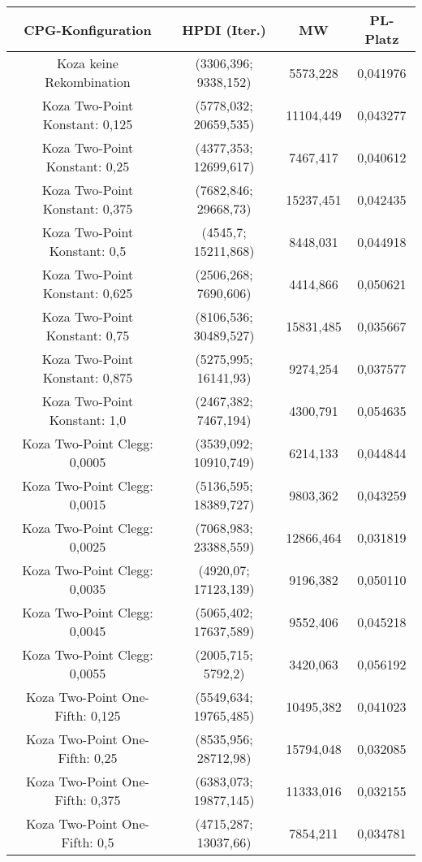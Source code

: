 \begin{table}[H]
	\centering
	\begin{tabular}{c | c | c | c}
		\textbf{CPG-Konfiguration} & \textbf{HPDI (Iter.)} & \textbf{MW} & \textbf{PL-Platz}\\
		\hline
		Koza keine Rekombination & (3306,396; 9338,152) & 5573,228 & 0,041976\\
		\hline
		Koza Two-Point Konstant: 0,125 & (5778,032; 20659,535) & 11104,449 & 0,043277\\
		\hline
		Koza Two-Point Konstant: 0,25 & (4377,353; 12699,617) & 7467,417 & 0,040612\\
		\hline
		Koza Two-Point Konstant: 0,375 & (7682,846; 29668,73) & 15237,451 & 0,042435\\
		\hline
		Koza Two-Point Konstant: 0,5 & (4545,7; 15211,868) & 8448,031 & 0,044918\\
		\hline
		Koza Two-Point Konstant: 0,625 & (2506,268; 7690,606) & 4414,866 & 0,050621\\
		\hline
		Koza Two-Point Konstant: 0,75 & (8106,536; 30489,527) & 15831,485 & 0,035667\\
		\hline
		Koza Two-Point Konstant: 0,875 & (5275,995; 16141,93) & 9274,254 & 0,037577\\
		\hline
		Koza Two-Point Konstant: 1,0 & (2467,382; 7467,194) & 4300,791 & 0,054635\\
		\hline
		Koza Two-Point Clegg: 0,0005 & (3539,092; 10910,749) & 6214,133 & 0,044844\\
		\hline
		Koza Two-Point Clegg: 0,0015 & (5136,595; 18389,727) & 9803,362 & 0,043259\\
		\hline
		Koza Two-Point Clegg: 0,0025 & (7068,983; 23388,559) & 12866,464 & 0,031819\\
		\hline
		Koza Two-Point Clegg: 0,0035 & (4920,07; 17123,139) & 9196,382 & 0,050110\\
		\hline
		Koza Two-Point Clegg: 0,0045 & (5065,402; 17637,589) & 9552,406 & 0,045218\\
		\hline
		Koza Two-Point Clegg: 0,0055 & (2005,715; 5792,2) & 3420,063 & 0,056192\\
		\hline
		Koza Two-Point One-Fifth: 0,125 & (5549,634; 19765,485) & 10495,382 & 0,041023\\
		\hline
		Koza Two-Point One-Fifth: 0,25 & (8535,956; 28712,98) & 15794,048 & 0,032085\\
		\hline
		Koza Two-Point One-Fifth: 0,375 & (6383,073; 19877,145) & 11333,016 & 0,032155\\
		\hline
		Koza Two-Point One-Fifth: 0,5 & (4715,287; 13037,66) & 7854,211 & 0,034781\\

\end{tabular}
\end{table}
